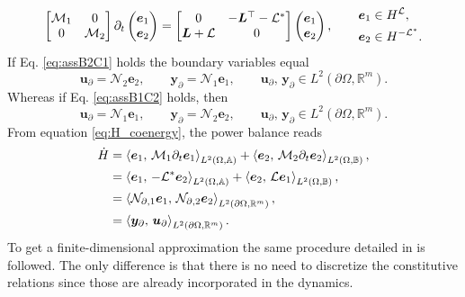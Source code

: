 \begin{equation}
	\label{eq:pHsys_dyn_linass} 
	\begin{bmatrix}
	\mathcal{M}_1 & 0 \\
	0 & \mathcal{M}_2 \\
	\end{bmatrix}
	\partial_t \begin{pmatrix}
	\bm{e}_1 \\ \bm{e}_2
	\end{pmatrix} = \begin{bmatrix}
	0 & -\bm{L}^\top - \mathcal{L}^* \\
	\bm{L} + \mathcal{L} & 0 \\
	\end{bmatrix}\begin{pmatrix}
	\bm{e}_1 \\ \bm{e}_2
	\end{pmatrix} , \qquad \begin{aligned}
	\bm{e}_1 &\in H^{\mathcal{L}}, 	\\
	\bm{e}_2 &\in H^{-\mathcal{L}^*}.
	\end{aligned}\\
\end{equation}
If Eq. \eqref{eq:assB2C1} holds the boundary variables equal 
\begin{equation}
\bm{u}_\partial = \mathcal{N}_2 \displaystyle \bm{e}_2, \qquad  \bm{y}_\partial = \mathcal{N}_1 \displaystyle \bm{e}_1, \qquad  \bm{u}_\partial,\, \bm{y}_\partial \in L^2(\partial\Omega, \mathbb{R}^m).
\end{equation}
Whereas if Eq. \eqref{eq:assB1C2} holds, then
\begin{equation}
\bm{u}_\partial = \mathcal{N}_1 \displaystyle \bm{e}_1, \qquad 
\bm{y}_\partial = \mathcal{N}_2 \displaystyle \bm{e}_2, \qquad  \bm{u}_\partial,\, \bm{y}_\partial \in L^2(\partial\Omega, \mathbb{R}^m). 
\end{equation}
From equation \eqref{eq:H_coenergy}, the power balance reads
\begin{equation}\label{eq:powbal_lin}
\begin{aligned}
\dot{H} &= \inner[L^2(\Omega, \mathbb{A})]{\bm{e}_1}{\mathcal{M}_1 \partial_{t} \bm{e}_1} + \inner[L^2(\Omega, \mathbb{B})]{\bm{e}_2}{\mathcal{M}_2 \partial_{t} \bm{e}_2}, \\
&=\inner[L^2(\Omega, \mathbb{A})]{\bm{e}_1}{-\mathcal{L}^* \bm{e}_2} + \inner[L^2(\Omega, \mathbb{B})]{\bm{e}_2}{\mathcal{L} \bm{e}_1}, \\
&= \inner[L^2(\partial \Omega, \mathbb{R}^m)]{\mathcal{N}_{\partial, 1} \bm{e}_1}{\mathcal{N}_{\partial, 2} \bm{e}_2}, \\
&= \inner[L^2(\partial \Omega, \mathbb{R}^m)]{\bm{y}_\partial}{\bm{u}_\partial}.
\end{aligned}
\end{equation}
To get a finite-dimensional approximation the same procedure detailed in  is followed. The only difference is that there is no need to discretize the constitutive relations since those are already incorporated in the dynamics. 


